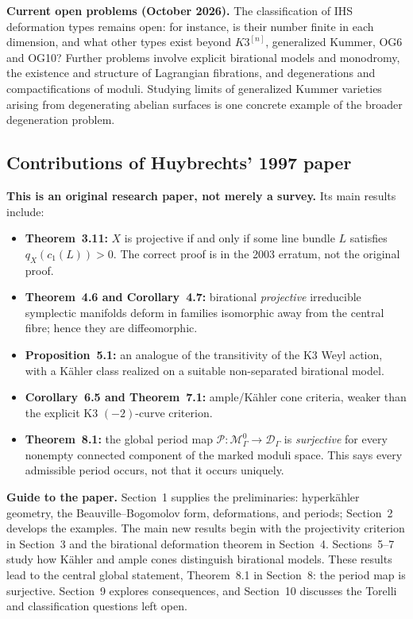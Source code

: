 \par\smallskip\noindent
\textbf{Current open problems (October 2026).}
The classification of IHS deformation
types remains open: for instance, is
their number finite in each dimension,
and what other types exist beyond
$K3^{[n]}$, generalized Kummer, OG6
and OG10? Further problems involve
explicit birational models and monodromy,
the existence and structure of Lagrangian
fibrations, and degenerations and
compactifications of moduli.
Studying limits
of generalized Kummer varieties arising
from degenerating abelian surfaces is
one concrete example of the broader
degeneration problem.

\subsection{Contributions of Huybrechts' 1997 paper}
\label{subsection-huybrechts-contributions}

\noindent
\textbf{This is an original research paper, not merely a survey.}
Its main results include:
\begin{itemize}
\item \textbf{Theorem~3.11:} $X$ is projective
if and only if some line bundle $L$ satisfies
$q_X(c_1(L))>0$. The correct proof is in
the 2003 erratum, not the original proof.
\item \textbf{Theorem~4.6 and Corollary~4.7:}
birational \emph{projective} irreducible symplectic
manifolds deform in families isomorphic away from
the central fibre; hence they are diffeomorphic.
\item \textbf{Proposition~5.1:} an analogue of
the transitivity of the K3 Weyl action, with
a K\"ahler class realized on a suitable
non-separated birational model.
\item \textbf{Corollary~6.5 and Theorem~7.1:}
ample/K\"ahler cone criteria, weaker than
the explicit K3 $(-2)$-curve criterion.
\item \textbf{Theorem~8.1:} the global period map
$\mathcal P:\mathcal M_\Gamma^0\to\mathcal D_\Gamma$
is \emph{surjective} for every nonempty connected
component of the marked moduli space.
This says every admissible period occurs,
not that it occurs uniquely.
\end{itemize}

\medskip\noindent
\textbf{Guide to the paper.}
Section~1 supplies the preliminaries: hyperk\"ahler
geometry, the Beauville--Bogomolov form,
deformations, and periods; Section~2 develops
the examples. The main new results begin with
the projectivity criterion in Section~3 and
the birational deformation theorem in Section~4.
Sections~5--7 study how K\"ahler and ample
cones distinguish birational models. These
results lead to the central global statement,
Theorem~8.1 in Section~8: the period map is
surjective. Section~9 explores consequences,
and Section~10 discusses the Torelli and
classification questions left open.

